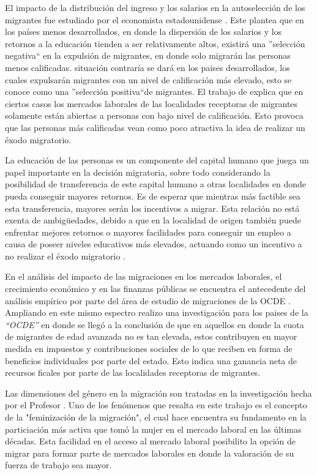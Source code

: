 \documentclass[12pt,a4paper]{article}
\begin{document}
El impacto de la distribución del ingreso y los salarios en la autoselección de los migrantes fue estudiado por el economista estadounidense \textcite{borjas_self-selection_1987}. Este plantea que en los países menos desarrollados, en donde la dispersión de los salarios y los retornos a la educación tienden a ser relativamente altos, existirá una ''selección negativa`` en la expulsión de migrantes, en donde solo migrarán las personas menos calificadas. situación contraría se dará en los paises desarrollados, los cuales expulsarán migrantes con un nivel de calificación más elevado, esto se conoce como una ''selección positiva``de migrantes. El trabajo de \textcite{stark_migration_1991} explica que en ciertos casos los mercados laborales de las localidades receptoras de migrantes solamente están abiertas a personas con bajo nivel de calificación. Esto provoca que las personas más calificadas vean como poco atractiva la idea de realizar un éxodo migratorio.

La educación de las personas es un componente del capital humano que juega un  papel importante en la decisión migratoria, sobre todo considerando la posibilidad de transferencia de este capital humano a otras localidades en donde pueda conseguir mayores retornos. Es de esperar que mientras más factible sea esta transferencia, mayores serán los incentivos a migrar. Esta relación no está exenta de ambigüedades, debido a que en la localidad de origen también puede enfrentar mejores retornos o mayores facilidades para conseguir un empleo a causa de poseer niveles educativos más elevados, actuando como un incentivo a no realizar el éxodo migratorio \parencite{danzer_economic_2008}.

En el análisis del impacto de las migraciones en los mercados laborales, el crecimiento económico y en las finanzas públicas se encuentra el antecedente del análisis empírico por parte del área de estudio de migraciones de la OCDE \textcite{dumont_is_2014}. Ampliando en este mismo espectro \textcite{liebig_fiscal_2013} realizo una investigación para los paises de la \textit{``OCDE''} en donde se llegó a la conclusión de que en aquellos en donde la cuota de migrantes de edad avanzada no es tan elevada, estos contribuyen en mayor medida en impuestos y contribuciones sociales de lo que reciben en forma de beneficios individuales por parte del estado. Esto indica una ganancia neta de recursos ficales por parte de las localidades receptoras de migrantes.

Las dimensiones del género en la migración son tratadas en la investigación hecha por el Profesor \textcite{carling_gender_2005}. Uno de los fenómenos que resalta en este trabajo es el concepto de la "feminización de la migración", el cual hace encuentra su fundamento en la particiación más activa que tomó la mujer en el mercado laboral en las últimas décadas. Esta facilidad en el acceso al mercado laboral posibilito la opción de migrar para formar parte de mercados laborales en donde la valoración de su fuerza de trabajo sea mayor.
\end{document}
